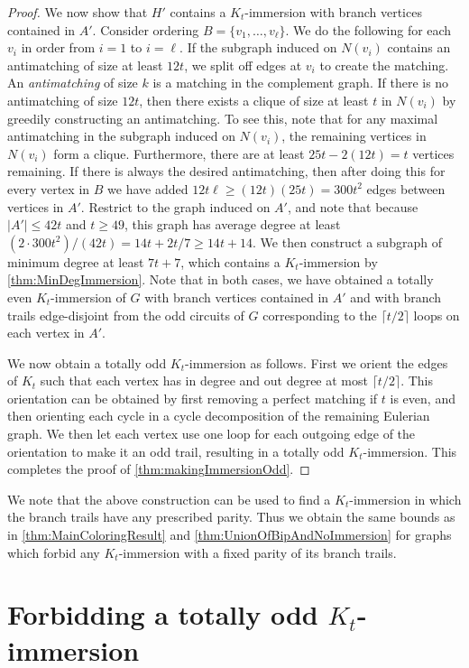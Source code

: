 \documentclass{article}
\theoremstyle{definition}
\begin{document}
\begin{proof}
    We now show that $H'$ contains a $K_t$-immersion with branch vertices contained in $A'$. Consider ordering $B = \{v_1, \ldots, v_{\ell}\}$. We do the following for each $v_i$ in order from $i=1$ to $i=\ell$. If the subgraph induced on $N(v_i)$ contains an antimatching of size at least $12t$, we split off edges at $v_i$ to create the matching. An \emph{antimatching} of size $k$ is a matching in the complement graph. If there is no antimatching of size $12t$, then there exists a clique of size at least $t$ in $N(v_i)$ by greedily constructing an antimatching. To see this, note that for any maximal antimatching in the subgraph induced on $N(v_i)$, the remaining vertices in $N(v_i)$ form a clique. Furthermore, there are at least $25t-2(12t)=t$ vertices remaining. If there is always the desired antimatching, then after doing this for every vertex in $B$ we have added $12t\ell \geq (12t)(25t) = 300t^2$ edges between vertices in $A'$. Restrict to the graph induced on $A'$, and note that because $|A'| \leq 42t$ and $t \geq 49$, this graph has average degree at least $(2 \cdot 300t^2)/(42t)=14t+2t/7\geq 14t + 14$. We then construct a subgraph of minimum degree at least $7t + 7$, which contains a $K_t$-immersion by \cref{thm:MinDegImmersion}. Note that in both cases, we have obtained a totally even $K_t$-immersion of $G$ with branch vertices contained in $A'$ and with branch trails edge-disjoint from the odd circuits of $G$ corresponding to the $\lceil t/2 \rceil$ loops on each vertex in $A'$.

    We now obtain a totally odd $K_t$-immersion as follows. First we orient the edges of $K_t$ such that each vertex has in degree and out degree at most $\lceil t/2 \rceil$. This orientation can be obtained by first removing a perfect matching if $t$ is even, and then orienting each cycle in a cycle decomposition of the remaining Eulerian graph. We then let each vertex use one loop for each outgoing edge of the orientation to make it an odd trail, resulting in a totally odd $K_t$-immersion. This completes the proof of \cref{thm:makingImmersionOdd}.
\end{proof}

We note that the above construction can be used to find a $K_t$-immersion in which the branch trails have any prescribed parity. Thus we obtain the same bounds as in \cref{thm:MainColoringResult} and \cref{thm:UnionOfBipAndNoImmersion} for graphs which forbid any $K_t$-immersion with a fixed parity of its branch trails.

\section{Forbidding a totally odd $K_t$-immersion}
\end{document}
